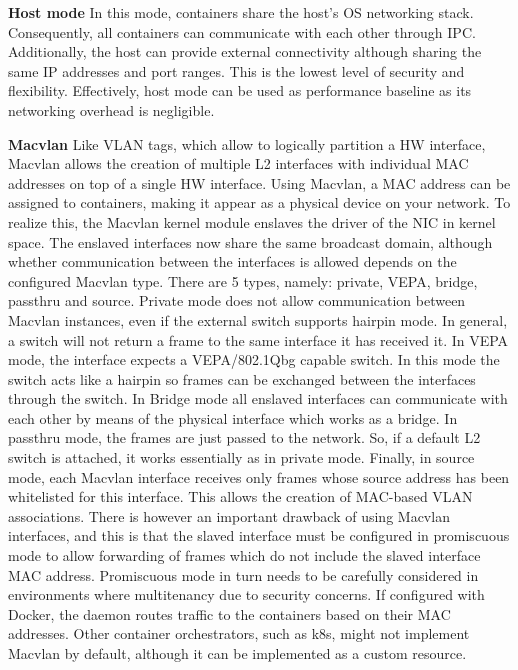 \documentclass[conference]{IEEEtran}
\begin{document}
\noindent\textbf{Host mode} \hspace{0.5cm}In this mode, containers share the host's OS networking stack. Consequently, all containers can communicate with each other through IPC. Additionally, the host can provide external connectivity although sharing the same IP addresses and port ranges. This is the lowest level of security and flexibility. Effectively, host mode can be used as performance baseline as its networking overhead is negligible.

\noindent\textbf{Macvlan}  \hspace{0.5cm} Like VLAN tags, which allow to logically partition a HW interface, Macvlan allows the creation of multiple L2 interfaces with individual MAC addresses on top of a single HW interface. Using Macvlan, a MAC address can be assigned to containers, making it appear as a physical device on your network. To realize this, the Macvlan kernel module enslaves the driver of the NIC in kernel space. The enslaved interfaces now share the same broadcast domain, although whether communication between the interfaces is allowed depends on the configured Macvlan type. There are 5 types, namely: private, VEPA, bridge, passthru and source. Private mode does not allow communication between Macvlan instances, even if the external switch supports hairpin mode. In general, a switch will not return a frame to the same interface it has received it. In VEPA mode, the interface expects a VEPA/802.1Qbg capable switch. In this mode the switch acts like a hairpin so frames can be exchanged between the interfaces through the switch. In Bridge mode all enslaved interfaces can communicate with each other by means of the physical interface which works as a bridge. In passthru mode, the frames are just passed to the network. So, if a default L2 switch is attached, it works essentially as in private mode. Finally, in source mode, each Macvlan interface receives only frames whose source address has been whitelisted for this interface. This allows the creation of MAC-based VLAN associations.
There is however an important drawback of using Macvlan interfaces, and this is that the slaved interface must be configured in promiscuous mode to allow forwarding of frames which do not include the slaved interface MAC address. Promiscuous mode in turn needs to be carefully considered in environments where multitenancy due to security concerns.
If configured with Docker, the daemon routes traffic to the containers based on their MAC addresses. Other container orchestrators, such as k8s, might not implement Macvlan by default, although it can be implemented as a custom resource.
\end{document}
